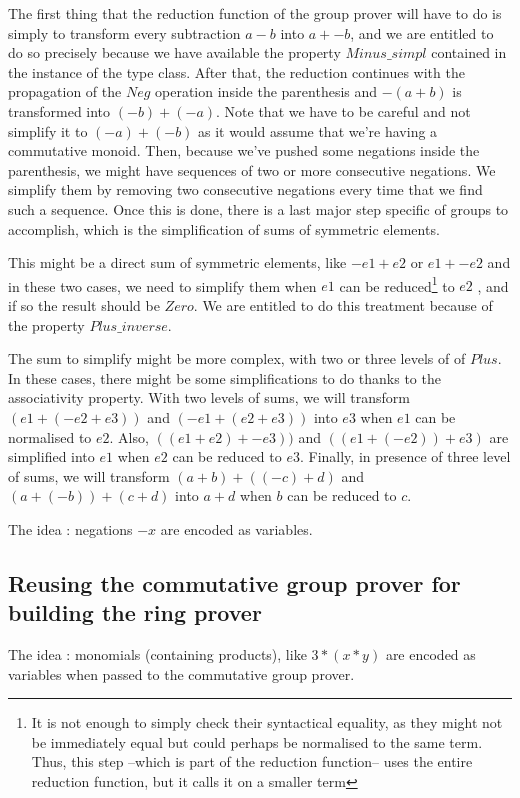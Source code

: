 The first thing that the reduction function of the group prover will have to do is simply to transform every subtraction $a-b$ into $a + -b$, and we are entitled to do so precisely because we have available the property $Minus\_simpl$ contained in the instance of the type class.
After that, the reduction continues with the propagation of the $Neg$ operation inside the parenthesis and $-(a+b)$ is transformed into $(-b) + (-a)$. Note that we have to be careful and not simplify it to $(-a) + (-b)$ as it would assume that we're having a commutative monoid.
Then, because we've pushed some negations inside the parenthesis, we might have sequences of two or more consecutive negations. We simplify them by removing two consecutive negations every time that we find such a sequence. Once this is done, there is a last major step specific of groups to accomplish, which is the simplification of sums of symmetric elements. 

This might be a direct sum of symmetric elements, like $-e1 + e2$ or $e1 + -e2$ and in these two cases, we need to simplify them when $e1$ can be reduced\footnote{It is not enough to simply check their syntactical equality, as they might not be immediately equal but could perhaps be normalised to the same term. Thus, this step --which is part of the reduction function-- uses the entire reduction function, but it calls it on a smaller term} to $e2$ , and if so the result should be $Zero$. We are entitled to do this treatment because of the property $Plus\_inverse$.

The sum to simplify might be more complex, with two or three levels of of $Plus$. In these cases, there might be some simplifications to do thanks to the associativity property. With two levels of sums, we will transform $(e1 + (-e2 + e3))$ and $(-e1 + (e2+e3))$ into $e3$ when $e1$ can be normalised to $e2$. Also, $((e1+e2) + -e3))$ and $((e1+(-e2)) + e3)$ are simplified into $e1$ when $e2$ can be reduced to $e3$. Finally, in presence of three level of sums, we will transform $(a+b) + ((-c)+d)$ and $(a+(-b)) + (c+d)$ into $a+d$ when $b$ can be reduced to $c$.


The idea : negations $-x$ are encoded as variables.

\subsection {Reusing the commutative group prover for building the ring prover}

The idea : monomials (containing products), like $3*(x*y)$ are encoded as variables when passed to the commutative group prover. 
